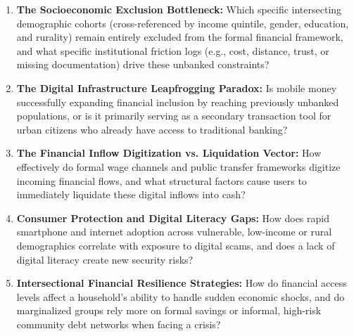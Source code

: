 \documentclass[../main.tex]{subfiles}
\begin{document}
\begin{enumerate}[label=\textbf{Q\arabic*.}, leftmargin=*]
\item \textbf{The Socioeconomic Exclusion Bottleneck:} Which specific intersecting demographic cohorts (cross-referenced by income quintile, gender, education, and rurality) remain entirely excluded from the formal financial framework, and what specific institutional friction logs (e.g., cost, distance, trust, or missing documentation) drive these unbanked constraints?

\item \textbf{The Digital Infrastructure Leapfrogging Paradox:} Is mobile money successfully expanding financial inclusion by reaching previously unbanked populations, or is it primarily serving as a secondary transaction tool for urban citizens who already have access to traditional banking?

\item \textbf{The Financial Inflow Digitization vs. Liquidation Vector:} How effectively do formal wage channels and public transfer frameworks digitize incoming financial flows, and what structural factors cause users to immediately liquidate these digital inflows into cash?

\item \textbf{Consumer Protection and Digital Literacy Gaps:} How does rapid smartphone and internet adoption across vulnerable, low-income or rural demographics correlate with exposure to digital scams, and does a lack of digital literacy create new security risks?

\item \textbf{Intersectional Financial Resilience Strategies:} How do financial access levels affect a household's ability to handle sudden economic shocks, and do marginalized groups rely more on formal savings or informal, high-risk community debt networks when facing a crisis?
\end{enumerate}
\end{document}
